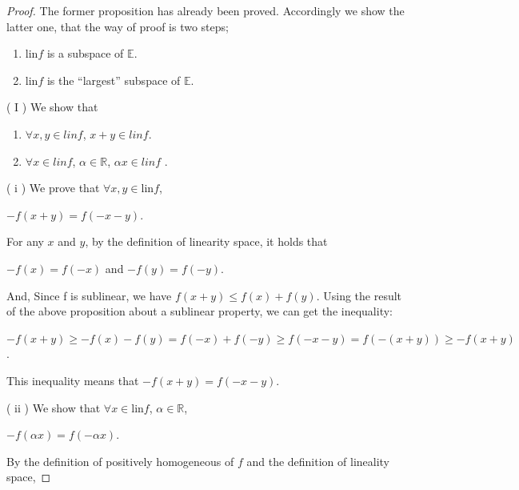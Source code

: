 \documentclass[a4paper,11pt]{jsarticle}
\begin{document}
\begin{proof}
  The former proposition has already been proved. Accordingly we show the latter one, that the way of proof is two steps;

  \begin{enumerate}[label=\Roman*,align=CenterWithParen]
    \item lin$f$ is a subspace of $\mathbb{E}$.
    \item lin$f$ is the ``largest'' subspace of $\mathbb{E}$.
  \end{enumerate}

  ( $\mathrm{I}$ ) We show that

  \begin{enumerate}[label=\roman*,align=CenterWithParen]
    \item $\forall x, y \in lin f$, $x + y \in lin f$.
    \item $\forall x \in lin f$, $\alpha \in{\mathbb{R}}$, $\alpha x \in lin f$ .
  \end{enumerate}

  ( $\mathrm{i}$ ) We prove that $\forall x, y \in \text{lin}f$,

  \begin{center}
    $-f(x+y) = f(-x-y)$.
  \end{center}

  For any $x$ and $y$, by the definition of linearity space, it holds that

  \begin{center}
    $-f(x) = f(-x)$ and
    $-f(y) = f(-y)$.
  \end{center}

  And, Since f is sublinear, we have $f(x + y) \leq f(x) + f(y)$. Using the result of the above proposition about a sublinear property, we can get the inequality:

  \begin{center}
    $-f(x+y) \geq - f(x) - f(y) = f(-x) + f(-y) \geq f(-x-y) = f(-(x+y)) \geq -f(x+y)$.
  \end{center}

  This inequality means that $-f(x+y) = f(-x-y)$.

  ( $\mathrm{ii}$ ) We show that $\forall x \in \text{lin}f$, $\alpha \in{\mathbb{R}}$,

  \begin{center}
    $-f(\alpha x) = f(-\alpha x)$.
  \end{center}

  By the definition of positively homogeneous of $f$ and the definition of lineality space,


\end{proof}
\end{document}
